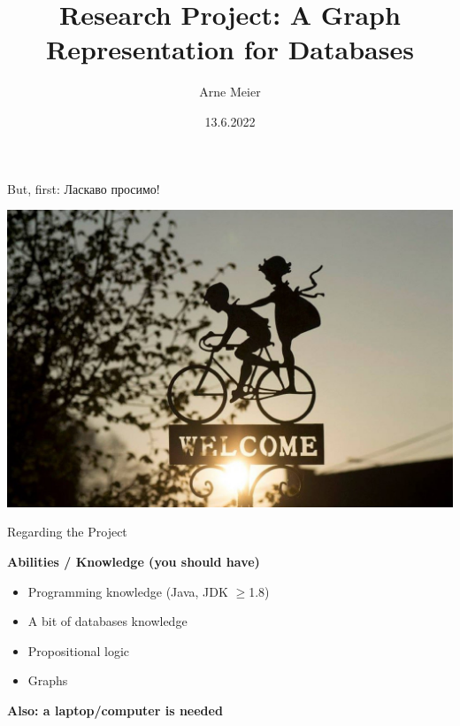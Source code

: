 \documentclass[]{beamer}
\title{Research Project: A Graph Representation for Databases}
\author{Arne Meier}
\date{13.6.2022}
\begin{document}
\begin{frame}
    \maketitle
\end{frame}

\begin{frame}{But, first: Ласкаво просимо!}
    \begin{center}
    	\includegraphics[width=\linewidth]{sign-741813_1280.jpg}
    \end{center}
\end{frame}

\begin{frame}{Regarding the Project}

\textbf{Abilities / Knowledge (you should have)}
\begin{itemize}
	\item Programming knowledge (Java, JDK $\ge$1.8)
	\item A bit of databases knowledge
	\item Propositional logic
	\item Graphs
\end{itemize}

\textbf{Also: a laptop/computer is needed}

\end{frame}
\end{document}
